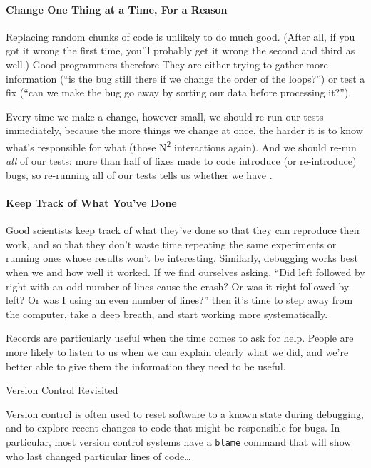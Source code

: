 \documentclass{book}
\begin{document}
\mbox{}\paragraph{Change One Thing at a Time, For a Reason}

Replacing random chunks of code is unlikely to do much good. (After all,
if you got it wrong the first time, you'll probably get it wrong the
second and third as well.) Good programmers therefore
 They are either trying to gather more information
(``is the bug still there if we change the order of the loops?'') or
test a fix (``can we make the bug go away by sorting our data before
processing it?'').

Every time we make a change, however small, we should re-run our tests
immediately, because the more things we change at once, the harder it is
to know what's responsible for what (those N\textsuperscript{2}
interactions again). And we should re-run \emph{all} of our tests: more
than half of fixes made to code introduce (or re-introduce) bugs, so
re-running all of our tests tells us whether we have
.

\mbox{}\paragraph{Keep Track of What You've Done}

Good scientists keep track of what they've done so that they can
reproduce their work, and so that they don't waste time repeating the
same experiments or running ones whose results won't be interesting.
Similarly, debugging works best when we
 and how well it worked. If we find ourselves asking,
``Did left followed by right with an odd number of lines cause the
crash? Or was it right followed by left? Or was I using an even number
of lines?'' then it's time to step away from the computer, take a deep
breath, and start working more systematically.

Records are particularly useful when the time comes to ask for help.
People are more likely to listen to us when we can explain clearly what
we did, and we're better able to give them the information they need to
be useful.

\begin{swcbox}{Version Control Revisited}

Version control is often used to reset software to a known state during
debugging, and to explore recent changes to code that might be
responsible for bugs. In particular, most version control systems have a
\texttt{blame} command that will show who last changed particular lines
of code\ldots{}

\end{swcbox}
\end{document}

